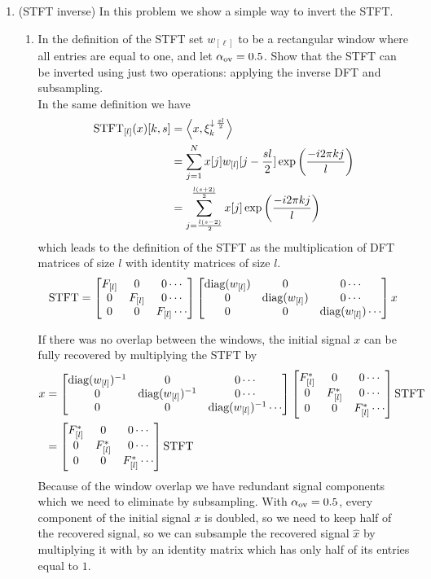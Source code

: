 \documentclass[12pt,twoside]{article}
\begin{document}
\begin{enumerate}
\begin{enumerate}
 \end{enumerate}
  
 \newpage
 \item (STFT inverse) In this problem we show a simple way to invert the STFT.
 \begin{enumerate}
  \item In the definition of the STFT set $w_{[\ell]}$ to be a rectangular window where all entries are equal to one, and let $\alpha_{\operatorname{ov}}=0.5$. Show that the STFT can be inverted using just two operations: applying the inverse DFT and subsampling.\\
  In the same definition we have
  \begin{align*}
  	\text{STFT}_{[l]}(x)[k,s]	&=	\left \langle x, \xi_k^{\downarrow \, \frac{sl}{2}}\right \rangle\\
						&=	\sum_{j=1}^N x[j] w_{[l]}[j-\frac{sl}{2}]  \exp \left( \frac{-i 2 \pi k j}{l} \right) \\
						&=	\sum_{j=\frac{l (s-2)}{2}}^{\frac{l(s+2)}{2}} x[j] \exp \left( \frac{-i 2 \pi k j}{l} \right) \\
  \end{align*}
  which leads to the definition of the STFT as the multiplication of DFT matrices of size $l$ with identity matrices of size $l$.
  $$
  	\text{STFT} = \begin{bmatrix} F_{[l]} & 0 & 0 \cdots \\
				0 & F_{[l]} & 0  \cdots \\
				0 & 0 &  F_{[l]}  \cdots  \end{bmatrix} 
				\begin{bmatrix}  \text{diag}(w_{[l]}) & 0 & 0 \cdots \\
					 0 & \text{diag}(w_{[l]}) & 0 \cdots \\
					 0 & 0 & \text{diag}(w_{[l]}) \cdots \end{bmatrix} x
  $$
  
  If there was no overlap between the windows, the initial signal $x$ can be fully recovered by multiplying the STFT by 
 \begin{align*}
  				x& = \begin{bmatrix}  \text{diag}(w_{[l]})^{-1} & 0 & 0 \cdots \\
					 0 & \text{diag}(w_{[l]})^{-1} & 0 \cdots \\
					 0 & 0 & \text{diag}(w_{[l]})^{-1} \cdots \end{bmatrix} 
				\begin{bmatrix} F_{[l]}^* & 0 & 0 \cdots \\
				0 & F_{[l]}^* & 0  \cdots \\
				0 & 0 &  F_{[l]}^*  \cdots  \end{bmatrix} \text{STFT} \\
			&=
				\begin{bmatrix} F_{[l]}^* & 0 & 0 \cdots \\
				0 & F_{[l]}^* & 0  \cdots \\
				0 & 0 &  F_{[l]}^*  \cdots  \end{bmatrix} \text{STFT}
\end{align*} 
 Because of the window overlap we have redundant signal components which we need to eliminate by subsampling. With  $\alpha_{\operatorname{ov}}=0.5$,  every component of the initial signal $x$ is doubled,
 so we need to keep half of the recovered signal, so we can subsample the recovered signal $\hat{x}$ by multiplying it with by an identity matrix which has only half of its entries equal to $1$.
  

\end{enumerate}
\end{enumerate}
\end{document}
